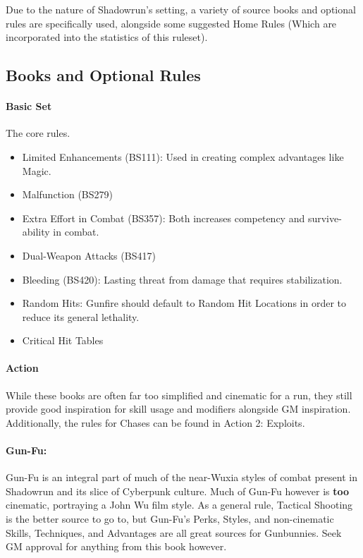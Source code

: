 
\begin{multicols*}{3}
	
	Due to the nature of Shadowrun's setting, a variety of source books and optional rules are specifically used, alongside some suggested Home Rules (Which are incorporated into the statistics of this ruleset).
	
	\subsection{Books and Optional Rules}
	
	\paragraph{\GURPS Basic Set}
	The core rules.
	\begin{itemize}
		\itemsep0em 
		\item Limited Enhancements (BS111): Used in creating complex advantages like Magic.
		\item Malfunction (BS279)
		\item Extra Effort in Combat (BS357): Both increases competency and survive-ability in combat.
		\item Dual-Weapon Attacks (BS417)
		\item Bleeding (BS420): Lasting threat from damage that requires stabilization.
		\item Random Hits: Gunfire should default to Random Hit Locations in order to reduce its general lethality.
		\item Critical Hit Tables
	\end{itemize}

	\paragraph{\GURPS Action}
	While these books are often far too simplified and cinematic for a run, they still provide good inspiration for skill usage and modifiers alongside GM inspiration. Additionally, the rules for Chases can be found in \GURPS Action 2: Exploits.
	
	\paragraph{\GURPS Gun-Fu:}
	Gun-Fu is an integral part of much of the near-Wuxia styles of combat present in Shadowrun and its slice of Cyberpunk culture. Much of \GURPS Gun-Fu however is \textbf{too} cinematic, portraying a John Wu film style. As a general rule, Tactical Shooting is the better source to go to, but Gun-Fu's Perks, Styles, and non-cinematic Skills, Techniques, and Advantages are all great sources for Gunbunnies. Seek GM approval for anything from this book however.
	

\end{multicols*}
